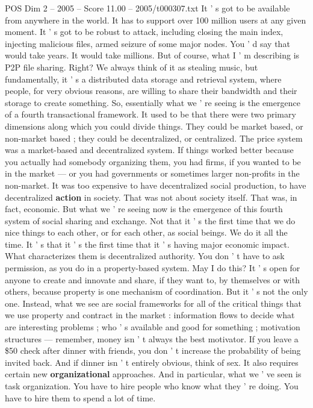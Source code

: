 \begin{textsample}{POS Dim 2 – 2005 – Score 11.00 – 2005/t000307.txt}
It ' s got to be available from anywhere in the world.
It has to support over 100 million users at any given moment.
It ' s got to be robust to attack, including closing the main index, injecting malicious files, armed seizure of some major nodes.
You ' d say that would take years.
It would take millions.
But of course, what I ' m describing is P2P file sharing.
Right?
We always think of it as stealing music, but fundamentally, it ' s a distributed data storage and retrieval system, where people, for very obvious reasons, are willing to share their bandwidth and their storage to create something.
So, essentially what we ' re seeing is the emergence of a fourth transactional framework.
It used to be that there were two primary dimensions along which you could divide things.
They could be market based, or non-market based ; they could be decentralized, or centralized.
The price system was a market-based and decentralized system.
If things worked better because you actually had somebody organizing them, you had firms, if you wanted to be in the market — or you had governments or sometimes larger non-profits in the non-market.
It was too expensive to have decentralized social production, to have decentralized \textbf{action} in society.
That was not about society itself.
That was, in fact, economic.
But what we ' re seeing now is the emergence of this fourth system of social sharing and exchange.
Not that it ' s the first time that we do nice things to each other, or for each other, as social beings.
We do it all the time.
It ' s that it ' s the first time that it ' s having major economic impact.
What characterizes them is decentralized authority.
You don ' t have to ask permission, as you do in a property-based system.
May I do this?
It ' s open for anyone to create and innovate and share, if they want to, by themselves or with others, because property is one mechanism of coordination.
But it ' s not the only one.
Instead, what we see are social frameworks for all of the critical things that we use property and contract in the market : information flows to decide what are interesting problems ; who ' s available and good for something ; motivation structures — remember, money isn ' t always the best motivator.
If you leave a \$50 check after dinner with friends, you don ' t increase the probability of being invited back.
And if dinner isn ' t entirely obvious, think of sex.
It also requires certain new \textbf{organizational} approaches.
And in particular, what we ' ve seen is task organization.
You have to hire people who know what they ' re doing.
You have to hire them to spend a lot of time.

\end{textsample}
